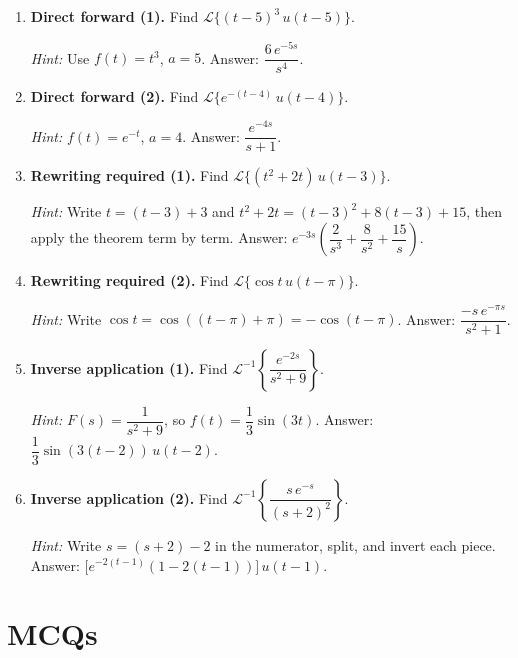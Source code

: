\documentclass[12pt,a4paper]{article}
\begin{document}
\begin{enumerate}[label=\textbf{P\arabic*.}]

\item \textbf{Direct forward (1).}
  Find $\mathcal{L}\{(t-5)^3\,u(t-5)\}$.

  \textit{Hint: } Use $f(t) = t^3$, $a = 5$. Answer: $\dfrac{6\,e^{-5s}}{s^4}$.

\item \textbf{Direct forward (2).}
  Find $\mathcal{L}\{e^{-(t-4)}\,u(t-4)\}$.

  \textit{Hint: } $f(t) = e^{-t}$, $a = 4$. Answer: $\dfrac{e^{-4s}}{s+1}$.

\item \textbf{Rewriting required (1).}
  Find $\mathcal{L}\{(t^2 + 2t)\,u(t-3)\}$.

  \textit{Hint: } Write $t = (t-3)+3$ and $t^2 + 2t = (t-3)^2 + 8(t-3) + 15$, then apply the
  theorem term by term.
  Answer: $e^{-3s}\!\left(\dfrac{2}{s^3}+\dfrac{8}{s^2}+\dfrac{15}{s}\right)$.

\item \textbf{Rewriting required (2).}
  Find $\mathcal{L}\{\cos t\,u(t-\pi)\}$.

  \textit{Hint: } Write $\cos t = \cos((t-\pi)+\pi) = -\cos(t-\pi)$.
  Answer: $\dfrac{-s\,e^{-\pi s}}{s^2+1}$.

\item \textbf{Inverse application (1).}
  Find $\mathcal{L}^{-1}\!\left\{\dfrac{e^{-2s}}{s^2+9}\right\}$.

  \textit{Hint: } $F(s)=\dfrac{1}{s^2+9}$, so $f(t) = \dfrac{1}{3}\sin(3t)$.
  Answer: $\dfrac{1}{3}\sin(3(t-2))\,u(t-2)$.

\item \textbf{Inverse application (2).}
  Find $\mathcal{L}^{-1}\!\left\{\dfrac{s\,e^{-s}}{(s+2)^2}\right\}$.

  \textit{Hint: } Write $s = (s+2) - 2$ in the numerator, split, and invert each piece.
  Answer: $\bigl[e^{-2(t-1)}(1 - 2(t-1))\bigr]\,u(t-1)$.

\end{enumerate}

\section{MCQs}
\end{document}

